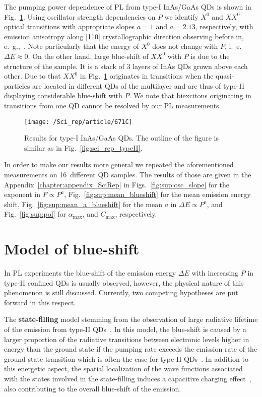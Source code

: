 The pumping power dependence of PL from type-I InAs/GaAs QDs is shown in Fig.~\ref{fig:671C}. Using oscillator strength dependencies on $P$ we identify  $X^0$ and $XX^0$ optical transitions with appropriate slopes $a=1$ and $a=2.13$, respectively, with emission anisotropy along [110] crystallographic direction observing before in, e.~g.,~\citep{HumPhysE}. Note particularly that the energy of $X^0$ does not change with $P$, i.~e. $\Delta E\approx 0$. On the other hand, large blue-shift of $XX^0$ with $P$ is due to the structure of the sample. It is a stack of 3 layers of InAs QDs grown above each other. Due to that $XX^0$ in Fig.~\ref{fig:671C} originates in transitions when the quasi-particles are located in different QDs of the multilayer and are thus of type-II displaying considerable blue-shift with $P$. We note that biexcitons originating in transitions from one QD cannot be resolved by our PL measurements.
%
\begin{figure}
	\centering
	\texttt{[image: /Sci\_rep/article/671C]}
	\caption{Results for type-I InAs/GaAs QDs. The outline of the figure is similar as in Fig.~\ref{fig:sci_rep_typeII}.}
	\label{fig:671C}
\end{figure}

In order to make our results more general we repeated the aforementioned measurements on 16~different QD samples. The results of those are given in the Appendix~\ref{chapter:appendix_SciRep} in Figs.~\ref{fig:sup:osc_slope} for the exponent in $F\propto P^a$, Fig.~\ref{fig:sup:mean_blueshift} for the mean emission energy shift, Fig.~\ref{fig:sup:mean_a_blueshift} for the mean $a$ in $\Delta E \propto P^a$, and Fig.~\ref{fig:sup:pol} for $\alpha_{\mathrm{max}}$, and $C_{\mathrm{max}}$, respectively.
\newpage 





\section{Model of blue-shift}\label{sec:scirep_pumpingmodel}
In PL experiments the blue-shift of the emission energy $\Delta E$ with increasing $P$ in type-II confined QDs is usually observed, however, the physical nature of this phenomenon is still discussed. Currently, two competing hypotheses are put forward in this respect.

The \textbf{state-filling} model stemming from the observation of large radiative lifetime of the emission from type-II QDs~\citep{Liao2009,Nishikawa2012,Sato2012,Pavarelli2012,Young2014}. In this model, the blue-shift is caused by a larger proportion of the radiative transitions between electronic levels higher in energy than the ground state if the pumping rate exceeds the emission rate of the ground state transition which is often the case for type-II QDs~\citep{Gradkowski2012}. In addition to this energetic aspect, the spatial localization of the wave functions associated with the states involved in the state-filling induces a capacitive charging effect~\citep{Muller-Kirsch2001}, also contributing to the overall blue-shift of the emission.


